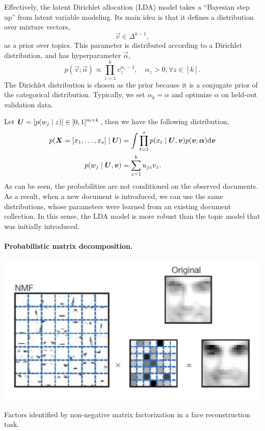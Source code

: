 Effectively, the latent Dirichlet allocation (LDA) model takes a ``Bayesian step up'' from latent
variable modeling. Its main idea is that it defines a distribution over mixture vectors, \[
    \vec{v} \in \Delta^{k-1},
\]
as a prior over topics. This parameter is distributed according to a Dirichlet distribution, and
has hyperparameter $\vec{\alpha}$, \[
    p(\vec{v}; \vec{\alpha}) \propto \prod_{z=1}^{k} v_z^{\alpha_z - 1}, \quad \alpha_z > 0, \forall z \in [k].
\]
The Dirichlet distribution is chosen as the prior because it is a conjugate prior of the
categorical distribution. Typically, we set $\alpha_k = \alpha$ and optimize $\alpha$ on held-out
validation data.

Let $\bm{U} = [p(w_j \mid z)] \in [0,1]^{m \times k}$, then we have the following distribution,
\begin{align*}
    p(\bm{X}=[x_1, \ldots, x_s] \mid \bm{U}) & = \int \prod_{t=1}^{s} p(x_t \mid \bm{U}, \bm{v}) p(\bm{v}; \bm{\alpha}) \mathrm{d}\bm{v} \\
    p(w_j \mid \bm{U}, \bm{v})               & = \sum_{z=1}^{k} u_{jz} v_z.
\end{align*}
As can be seen, the probabilities are not conditioned on the observed documents. As a result, when a
new document is introduced, we can use the same distributions, whose parameters were learned from an
existing document collection. In this sense, the LDA model is more robust than the topic model that
was initially introduced.

\paragraph{Probabilistic matrix decomposition.}

\begin{marginfigure}
    \centering
    \includegraphics[width=\textwidth]{figures/nmf_face}
    \caption{Factors identified by non-negative matrix factorization in a face reconstruction task.}
    \label{fig:nmf}
\end{marginfigure}

